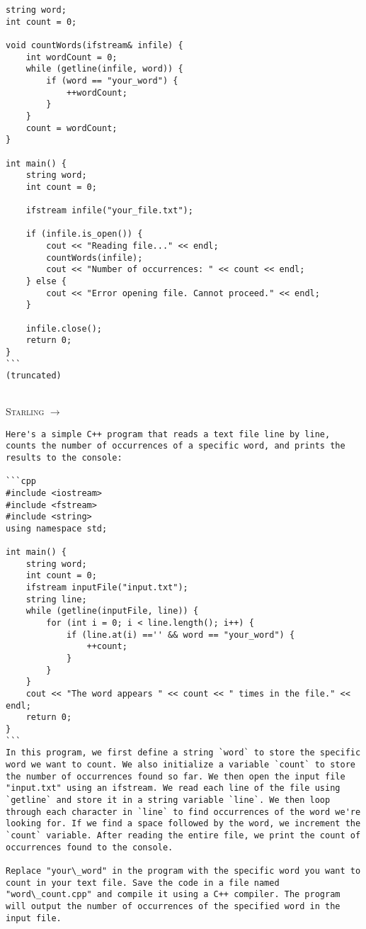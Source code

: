 \documentclass{article}
\newlength\mydepth
\newcommand{\starlingemojititle}{\textsc{Starling}\raisebox{-\mydepth}{\texttt{[image: images/starling-final.png]}}}
\begin{document}
{\begin{lstlisting}[upquote=true]
string word;
int count = 0;

void countWords(ifstream& infile) {
    int wordCount = 0;
    while (getline(infile, word)) {
        if (word == "your_word") {
            ++wordCount;
        }
    }
    count = wordCount;
}

int main() {
    string word;
    int count = 0;

    ifstream infile("your_file.txt");

    if (infile.is_open()) {
        cout << "Reading file..." << endl;
        countWords(infile);
        cout << "Number of occurrences: " << count << endl;
    } else {
        cout << "Error opening file. Cannot proceed." << endl;
    }

    infile.close();
    return 0;
}
```
(truncated)
\end{lstlisting}
\begin{tabular}{c|c}
\midrule
\end{tabular}
\newpage
\starlingemojititle{} $\to$
\begin{lstlisting}[upquote=true]
Here's a simple C++ program that reads a text file line by line, counts the number of occurrences of a specific word, and prints the results to the console:   

```cpp                                         
#include <iostream>
#include <fstream>
#include <string>                                              
using namespace std;

int main() {
    string word;
    int count = 0;
    ifstream inputFile("input.txt");
    string line;
    while (getline(inputFile, line)) {
        for (int i = 0; i < line.length(); i++) {
            if (line.at(i) =='' && word == "your_word") {
                ++count;
            }
        }
    }
    cout << "The word appears " << count << " times in the file." << endl;
    return 0;
}
```
In this program, we first define a string `word` to store the specific word we want to count. We also initialize a variable `count` to store the number of occurrences found so far. We then open the input file "input.txt" using an ifstream. We read each line of the file using `getline` and store it in a string variable `line`. We then loop through each character in `line` to find occurrences of the word we're looking for. If we find a space followed by the word, we increment the `count` variable. After reading the entire file, we print the count of occurrences found to the console.

Replace "your\_word" in the program with the specific word you want to count in your text file. Save the code in a file named "word\_count.cpp" and compile it using a C++ compiler. The program will output the number of occurrences of the specified word in the input file.


\end{lstlisting}}
\end{document}
